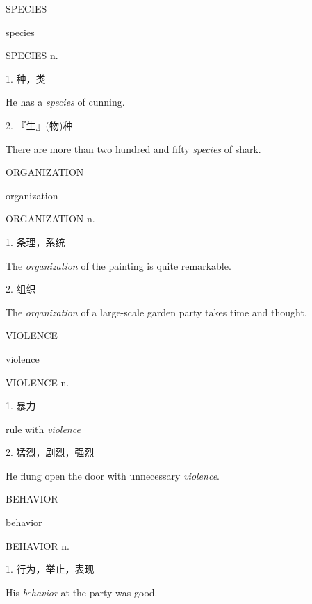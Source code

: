 \begin{flashcard}{
SPECIES

species
}
\begin{center}
SPECIES n. 
\end{center}
1. 种，类

He has a \textit{species} of cunning.

2. 『生』(物)种

There are more than two hundred and fifty \textit{species} of shark.

\end{flashcard}
\begin{flashcard}{
ORGANIZATION

organization
}
\begin{center}
ORGANIZATION n. 
\end{center}
1. 条理，系统

The \textit{organization} of the painting is quite remarkable.

2. 组织

The \textit{organization} of a large-scale garden party takes time and thought.

\end{flashcard}
\begin{flashcard}{
VIOLENCE

violence
}
\begin{center}
VIOLENCE n. 
\end{center}
1. 暴力

rule with \textit{violence}

2. 猛烈，剧烈，强烈

He flung open the door with unnecessary \textit{violence}.

\end{flashcard}
\begin{flashcard}{
BEHAVIOR

behavior
}
\begin{center}
BEHAVIOR n. 
\end{center}
1. 行为，举止，表现

His \textit{behavior} at the party was good.

\end{flashcard}
